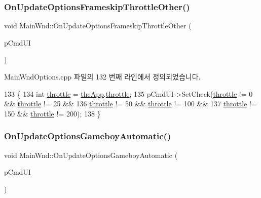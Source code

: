 \subsubsection{\texorpdfstring{On\+Update\+Options\+Frameskip\+Throttle\+Other()}{OnUpdateOptionsFrameskipThrottleOther()}}
{\footnotesize\ttfamily void Main\+Wnd\+::\+On\+Update\+Options\+Frameskip\+Throttle\+Other (\begin{DoxyParamCaption}\item[{C\+Cmd\+UI $\ast$}]{p\+Cmd\+UI }\end{DoxyParamCaption})\hspace{0.3cm}{\ttfamily [protected]}}



Main\+Wnd\+Options.\+cpp 파일의 132 번째 라인에서 정의되었습니다.


\begin{DoxyCode}
133 \{
134   \textcolor{keywordtype}{int} \mbox{\hyperlink{_s_d_l_8cpp_a2f20e9cb706f9e6756f8be02d2eaffff}{throttle}} = \mbox{\hyperlink{_v_b_a_8cpp_a8095a9d06b37a7efe3723f3218ad8fb3}{theApp}}.\mbox{\hyperlink{class_v_b_a_af21b98509a2589b38e4787f065b40a2b}{throttle}};
135   pCmdUI->SetCheck(\mbox{\hyperlink{_s_d_l_8cpp_a2f20e9cb706f9e6756f8be02d2eaffff}{throttle}} != 0 && \mbox{\hyperlink{_s_d_l_8cpp_a2f20e9cb706f9e6756f8be02d2eaffff}{throttle}} != 25 &&
136                    \mbox{\hyperlink{_s_d_l_8cpp_a2f20e9cb706f9e6756f8be02d2eaffff}{throttle}} != 50 && \mbox{\hyperlink{_s_d_l_8cpp_a2f20e9cb706f9e6756f8be02d2eaffff}{throttle}} != 100 &&
137                    \mbox{\hyperlink{_s_d_l_8cpp_a2f20e9cb706f9e6756f8be02d2eaffff}{throttle}} != 150 && \mbox{\hyperlink{_s_d_l_8cpp_a2f20e9cb706f9e6756f8be02d2eaffff}{throttle}} != 200);
138 \}
\end{DoxyCode}
\mbox{\label{class_main_wnd_abb2fc8aa13f0ac3379e8ce8ede02c8ad}} 
\subsubsection{\texorpdfstring{On\+Update\+Options\+Gameboy\+Automatic()}{OnUpdateOptionsGameboyAutomatic()}}
{\footnotesize\ttfamily void Main\+Wnd\+::\+On\+Update\+Options\+Gameboy\+Automatic (\begin{DoxyParamCaption}\item[{C\+Cmd\+UI $\ast$}]{p\+Cmd\+UI }\end{DoxyParamCaption})\hspace{0.3cm}{\ttfamily [protected]}}



